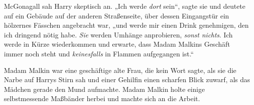McGonagall sah Harry skeptisch an.
„Ich werde \emph{dort} sein“, sagte sie und deutete auf ein Gebäude auf der anderen Straßenseite, über dessen Eingangstür ein hölzernes Fässchen angebracht war, „und werde mir einen Drink genehmigen, den ich dringend nötig habe. \emph{Sie} werden Umhänge anprobieren, \emph{sonst nichts}. Ich werde in Kürze wiederkommen und erwarte, dass Madam Malkins Geschäft immer noch steht und \emph{keinesfalls} in Flammen aufgegangen ist.“

Madam Malkin war eine geschäftige alte Frau, die kein Wort sagte, als sie die Narbe auf Harrys Stirn sah und einer Gehilfin einen scharfen Blick zuwarf, als das Mädchen gerade den Mund aufmachte. Madam Malkin holte einige selbstmessende Maßbänder herbei und machte sich an die Arbeit.

